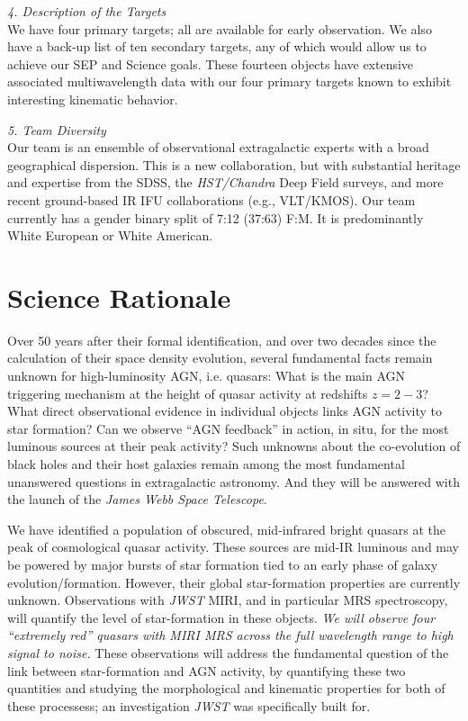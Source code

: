 \smallskip 
\smallskip \smallskip
\noindent
{\it 4. Description of the Targets}\\
We have four primary targets; all are available for early observation.
We also have a back-up list of ten secondary targets, any of which would 
allow us to achieve our SEP and Science goals. These fourteen objects have 
extensive associated 
multiwavelength data with our four primary targets known 
to exhibit interesting kinematic behavior. 


\smallskip 
\smallskip \smallskip
\noindent
{\it 5. Team Diversity}\\
Our team is an ensemble of observational extragalactic experts with a
broad geographical dispersion. This is a new collaboration, but with
substantial heritage and expertise from the SDSS, the {\it
HST/Chandra} Deep Field surveys, and more recent ground-based IR IFU
collaborations (e.g., VLT/KMOS).  Our team currently has a gender binary split
of 7:12 (37:63) F:M. It is predominantly White European or White American.


\section*{Science Rationale}
\vspace{-6pt}
\noindent
Over 50 years after their formal identification, and over two decades
since the calculation of their space density evolution, several
fundamental facts remain unknown for high-luminosity AGN,
i.e. quasars: What is the main AGN triggering mechanism at the height
of quasar activity at redshifts $z=2-3$? What direct observational
evidence in individual objects links AGN activity to star formation?
Can we observe ``AGN feedback'' in action, in situ, for the most
luminous sources at their peak activity?  Such unknowns about the
co-evolution of black holes and their host galaxies remain among the
most fundamental unanswered questions in extragalactic astronomy.  And
they will be answered with the launch of the {\it James Webb Space
Telescope}.

\smallskip \smallskip
\noindent
We have identified a population of obscured, mid-infrared bright
quasars at the peak of cosmological quasar activity.  These sources
are mid-IR luminous and may be powered by major bursts of star
formation tied to an early phase of galaxy
evolution/formation. However, their global star-formation properties
are currently unknown.  Observations with {\it JWST} MIRI, and in
particular MRS spectroscopy, will quantify the level of star-formation
in these objects.  {\it We will observe four ``extremely red'' quasars
with MIRI MRS across the full wavelength range to high signal to
noise.} These observations will address the fundamental question of
the link between star-formation and AGN activity, by quantifying these
two quantities and studying the morphological and kinematic properties
for both of these processess; an investigation {\it JWST} was
specifically built for.

